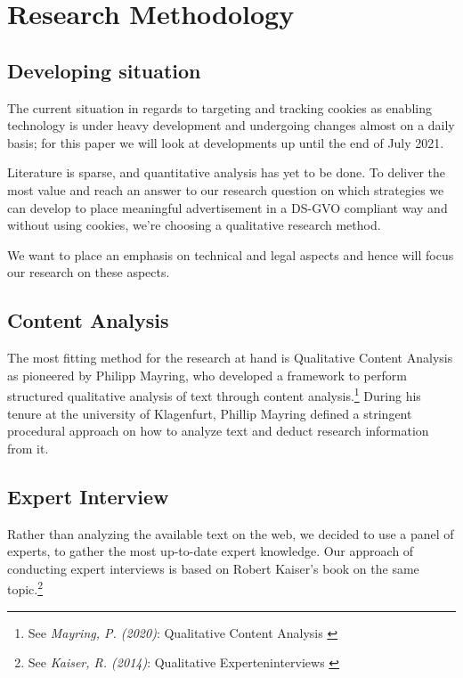 %
%

\pagebreak
\section{Research Methodology}

\onehalfspacing

\subsection{Developing situation}

The current situation in regards to targeting and tracking cookies as enabling technology is under heavy development and undergoing changes almost on a daily basis; for this paper we will look at developments up until the end of July 2021.

Literature is sparse, and quantitative analysis has yet to be done. To deliver the most value and reach an answer to our research question on which strategies we can develop to place meaningful advertisement in a DS-GVO compliant way and without using cookies, we're choosing a qualitative research method.

We want to place an emphasis on technical and legal aspects and hence will focus our research on these aspects.

\subsection{Content Analysis}

The most fitting method for the research at hand is Qualitative Content Analysis as pioneered by Philipp Mayring, who developed a framework to perform structured qualitative analysis of text through content analysis.\footnote{See \textit{Mayring, P. (2020)}: Qualitative Content Analysis \cite{qualiContent}} During his tenure at the university of Klagenfurt, Phillip Mayring defined a stringent procedural approach on how to analyze text and deduct research information from it.

\subsection{Expert Interview}

Rather than analyzing the available text on the web, we decided to use a panel of experts, to gather the most up-to-date expert knowledge. Our approach of conducting expert interviews is based on Robert Kaiser's book on the same topic.\footnote{See \textit{Kaiser, R. (2014)}: Qualitative Experteninterviews \cite{expertInterviews}}

